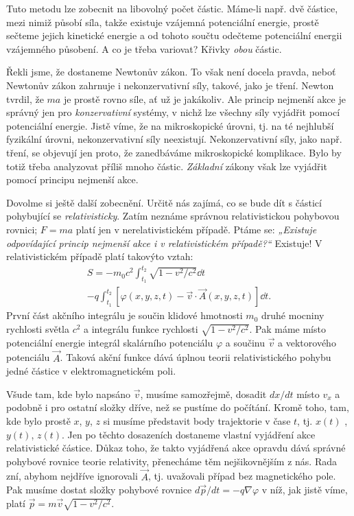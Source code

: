     Tuto metodu lze zobecnit na libovolný počet částic. Máme-li např. dvě částice, mezi nimiž
    působí síla, takže existuje vzájemná potenciální energie, prostě sečteme jejich kinetické
    energie a od tohoto součtu odečteme potenciální energii vzájemného působení. A co je třeba
    variovat? Křivky \emph{obou} částic.

    Řekli jsme, že dostaneme Newtonův zákon. To však není docela pravda, neboť Newtonův zákon
    zahrnuje i nekonzervativní síly, takové, jako je tření. Newton tvrdil, že \(ma\) je prostě rovno
    síle, ať už je jakákoliv. Ale princip nejmenší akce je správný jen pro \emph{konzervativní}
    systémy, v nichž lze všechny síly vyjádřit pomocí potenciální energie. Jistě víme, že na
    mikroskopické úrovni, tj. na té nejhlubší fyzikální úrovni, nekonzervativní síly neexistují.
    Nekonzervativní síly, jako např. tření, se objevují jen proto, že zanedbáváme mikroskopické
    komplikace. Bylo by totiž třeba analyzovat příliš mnoho částic. \emph{Základní} zákony však lze
    vyjádřit pomocí principu nejmenší akce.

    Dovolme si ještě další zobecnění. Určitě nás zajímá, co se bude dít s částicí pohybující se
    \emph{relativisticky}. Zatím neznáme správnou relativistickou pohybovou rovnici; \(F= ma\) platí
    jen v nerelativistickém případě. Ptáme se: \emph{„Existuje odpovídající princip nejmenší akce i
    v relativistickém případě?“} Existuje! V relativistickém případě platí takovýto vztah:
    \begin{multline}
      S = -m_0c^2\int_{t_1}^{t_2}\sqrt{1-{v^2}/{c^2}}\dd{t} \\
          -q\int_{t_1}^{t_2}\left[\varphi(x,y,z,t)-\vec{v}\cdot\vec{A}(x,y,z,t)\right]\dd{t}.
    \end{multline}
    První část akčního integrálu je součin klidové hmotnosti \(m_0\) druhé mocniny rychlosti světla
    \(c^2\) a integrálu funkce rychlosti \(\sqrt{1 - v^2/c^2}\). Pak máme místo potenciální energie
    integrál skalárního potenciálu \(\varphi\) a součinu \(\vec{v}\) a vektorového potenciálu
    \(\vec{A}\). Taková akční funkce dává úplnou teorii relativistického pohybu jedné částice v
    elektromagnetickém poli.

    Všude tam, kde bylo napsáno \(\vec{v}\), musíme samozřejmě, dosadit \(dx/dt\) místo \(v_x\) a
    podobně i pro ostatní složky dříve, než se pustíme do počítání. Kromě toho, tam, kde bylo prostě
    \(x\), \(y\), \(z\) si musíme představit body trajektorie v čase \(t\), tj. \(x(t)\) ,\(y(t)\),
    \(z(t)\). Jen po těchto dosazeních dostaneme vlastní vyjádření akce relativistické částice.
    Důkaz toho, že takto vyjádřená akce opravdu dává správné pohybové rovnice teorie relativity,
    přenecháme těm nejšikovnějším z nás. Rada zní, abyhom nejdříve ignorovali \(\vec{A}\), tj.
    uvažovali případ bez magnetického pole. Pak musíme dostat složky pohybové rovnice \(d\vec{p}/dt=
    - q\nabla\varphi\) v níž, jak jistě víme, platí \(\vec{p} = m\vec{v}\sqrt{1 - v^2/c^2}\).

